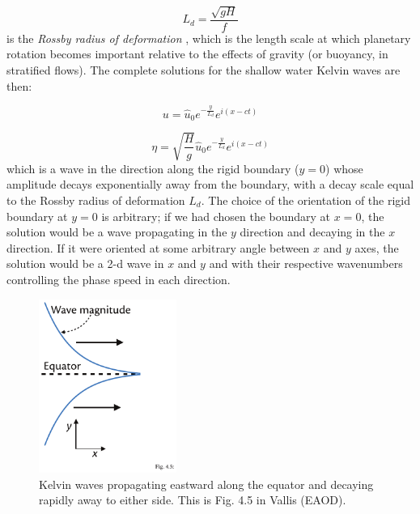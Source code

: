 \documentclass[12pt]{article}
\numberwithin{equation}{section}
\numberwithin{figure}{section}
\numberwithin{table}{section}
\begin{document}
\begin{equation}
  L_d = \frac{\sqrt{gH}}{f}
  \label{eq:rossby_deformation_radius}
\end{equation}
is the \textit{Rossby radius of deformation}
,
which is the length scale at which planetary rotation becomes important
relative to the effects of gravity (or buoyancy, in stratified flows).
The complete solutions for the shallow water Kelvin waves are then:

\begin{equation}
  u = \widehat{u}_0 e^{-\frac{y}{L_d}} e^{i(x - c t)}
\end{equation}

\begin{equation}
  \eta = \sqrt{\frac{H}{g}} \widehat{u}_0 e^{-\frac{y}{L_d}} e^{i(x - c t)}
\end{equation}
which is a wave in the direction along the rigid boundary ($y=0$) whose
amplitude decays exponentially away from the boundary, with a decay scale
equal to the Rossby radius of deformation $L_d$.
The choice of the orientation of the rigid boundary at $y=0$ is arbitrary;
if we had chosen the boundary at $x=0$, the solution would be a wave
propagating in the $y$ direction and decaying in the $x$ direction.
If it were oriented at some arbitrary angle between $x$ and $y$ axes, the
solution would be a 2-d wave in $x$ and $y$ and with their respective
wavenumbers controlling the phase speed in each direction.

\begin{figure}[h]
  \centering
  \includegraphics[width=0.4\textwidth]{assets/fig_kelvin_wave.pdf}
  \caption{
    Kelvin waves propagating eastward along the equator and decaying rapidly
    away to either side.
    This is Fig. 4.5 in Vallis (EAOD).
  }
\end{figure}
\end{document}
